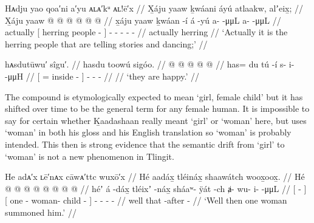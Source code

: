 \ex\label{ex:100-56-herring-stories-dancing}%
%
\begingl
	\glpreamble	Hᴀdju yao qoa′ni a′yu ᴀʟᴀ′kᵘ ᴀʟ!ē′x //
	\glpreamble	X̱áju yaaw ḵwáani áyú atlaakw, alʼeix̱;  //
	\gla	X̱áju {} yaaw  @ {} {}  @ {}
		 @ {} @ {}
		 @ {} @ {} //
	\glb	x̱áju {} yaaw ḵwáan -í {} á -yú
		a-  -μμL
		a-  -μμL //
	\glc	actually {}[ herring people - {}]  -
		-  -\hspace{1.5em}
		-  - //
	\gld	actually {} herring  {} {}  {}
		 {} {}
		 {} {} //
	\glft	‘Actually it is the herring people that are telling stories and dancing;’
		//
\endgl
\xe

\ex\label{ex:100-57-theyre-happy}%
%
\begingl
	\glpreamble	hᴀsdutūwu′ sîgu′. //
	\glpreamble	hasdu toowú sigóo. //
	\gla	{}  @ {}  @ {} {}
		 @ {} @ {} @ {} //
	\glb	{} has= du tú -í {}
		s- i-  -μμH //
	\glc	{}[ =  inside - {}]
		- -  - //
	\gld	{}  {}  {} {}
		 {} {} {} //
	\glft	‘they are happy.’
		//
\endgl
\xe

The compound is etymologically expected to mean ‘girl, female child’ but it has shifted over time to be the general term for any female human.
It is impossible to say for certain whether Ḵaadashaan really meant ‘girl’ or ‘woman’ here, but \textcite[313.7]{swanton:1909} uses ‘woman’ in both his gloss and his English translation so ‘woman’ is probably intended.
This then is strong evidence that the semantic drift from ‘girl’ to ‘woman’ is not a new phenomenon in Tlingit.

\ex\label{ex:100-58-theyre-happy}%
%
\begingl
	\glpreamble	He adᴀ′x ʟē′nᴀx cāwᴀ′ttc wuxō′x //
	\glpreamble	Hé aadáx̱ tléináx̱ shaawátch woox̱oox̱. //
	\gla	Hé {}  @ {} {}
		{}  @ {}  @ {} @ {} {}
		 @ {} @ {} @ {} @ {} //
	\glb	héʼ {} á -dáx̱ {}
		{} tléixʼ -náx̱ sháaʷ- ÿát -ch {} 
		ⱥ- wu- i-  -μμL //
	\glc	{} {}[  - {}]
		{}[ one - woman- child - {}]
		- - -  - //
	\gld	well {} that -after {}
		{}  {}  {} - {}
		 {} {} {} {} //
	\glft	‘Well then one woman summoned him.’
		//
\endgl
\xe

